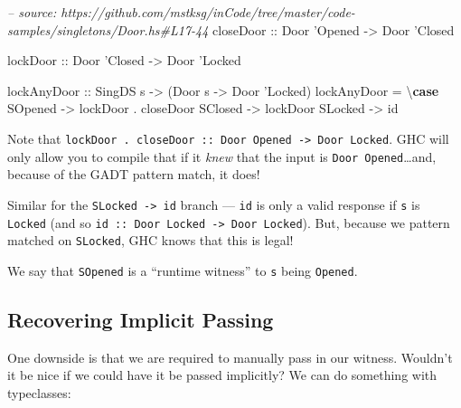 \documentclass[]{article}
\newenvironment{Shaded}{}{}
\newcommand{\KeywordTok}[1]{\textcolor[rgb]{0.00,0.44,0.13}{\textbf{#1}}}
\newcommand{\DataTypeTok}[1]{\textcolor[rgb]{0.56,0.13,0.00}{#1}}
\newcommand{\CharTok}[1]{\textcolor[rgb]{0.25,0.44,0.63}{#1}}
\newcommand{\CommentTok}[1]{\textcolor[rgb]{0.38,0.63,0.69}{\textit{#1}}}
\newcommand{\OtherTok}[1]{\textcolor[rgb]{0.00,0.44,0.13}{#1}}
\newcommand{\FunctionTok}[1]{\textcolor[rgb]{0.02,0.16,0.49}{#1}}
\newcommand{\NormalTok}[1]{#1}
\begin{document}
\begin{Shaded}
\begin{Highlighting}[]
\CommentTok{-- source: https://github.com/mstksg/inCode/tree/master/code-samples/singletons/Door.hs#L17-44}
\OtherTok{closeDoor ::} \DataTypeTok{Door} \CharTok{'Opened -> Door '}\DataTypeTok{Closed}

\OtherTok{lockDoor ::} \DataTypeTok{Door} \CharTok{'Closed -> Door '}\DataTypeTok{Locked}

\OtherTok{lockAnyDoor ::} \DataTypeTok{SingDS}\NormalTok{ s }\OtherTok{->}\NormalTok{ (}\DataTypeTok{Door}\NormalTok{ s }\OtherTok{->} \DataTypeTok{Door} \CharTok{'Locked)}
\NormalTok{lockAnyDoor }\FunctionTok{=}\NormalTok{ \textbackslash{}}\KeywordTok{case}
    \DataTypeTok{SOpened} \OtherTok{->}\NormalTok{ lockDoor }\FunctionTok{.}\NormalTok{ closeDoor}
    \DataTypeTok{SClosed} \OtherTok{->}\NormalTok{ lockDoor}
    \DataTypeTok{SLocked} \OtherTok{->}\NormalTok{ id}
\end{Highlighting}
\end{Shaded}

Note that
\texttt{lockDoor\ .\ closeDoor\ ::\ Door\ \textquotesingle{}Opened\ -\textgreater{}\ Door\ \textquotesingle{}Locked}.
GHC will only allow you to compile that if it \emph{knew} that the input is
\texttt{Door\ \textquotesingle{}Opened}\ldots{}and, because of the GADT pattern
match, it does!

Similar for the \texttt{SLocked\ -\textgreater{}\ id} branch --- \texttt{id} is
only a valid response if \texttt{s} is \texttt{\textquotesingle{}Locked} (and so
\texttt{id\ ::\ Door\ \textquotesingle{}Locked\ -\textgreater{}\ Door\ \textquotesingle{}Locked}).
But, because we pattern matched on \texttt{SLocked}, GHC knows that this is
legal!

We say that \texttt{SOpened} is a ``runtime witness'' to \texttt{s} being
\texttt{\textquotesingle{}Opened}.

\subsection{Recovering Implicit Passing}\label{recovering-implicit-passing}

One downside is that we are required to manually pass in our witness. Wouldn't
it be nice if we could have it be passed implicitly? We can do something with
typeclasses:
\end{document}
